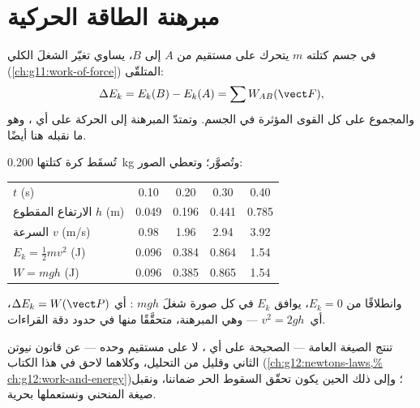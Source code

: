 \section{مبرهنة الطاقة الحركية}

\begin{theorem}\label{thm:g11:mechanical-energy:ketheorem}
في جسم كتلته $m$ يتحرك على مستقيم من $A$ إلى $B$،
يساوي تغيّر  الشغلَ الكلي
(\cref{ch:g11:work-of-force}) المتلقّى:
\[
\Delta E_k = E_k(B) - E_k(A) = \sum W_{AB}(\vect F),
\]
والمجموع على كل القوى المؤثرة في الجسم. وتمتدّ المبرهنة إلى
الحركة على أي ، وهو ما نقبله هنا أيضًا.
\end{theorem}
\admitted

\begin{example}\label{ex:g11:mechanical-energy:freefall}
تُسقَط كرة كتلتها \qty{0.200}{kg} وتُصوَّر؛ وتعطي الصور:
\begin{center}\small
\begin{tabular}{lcccc}
$t$ (\unit{s}) & 0.10 & 0.20 & 0.30 & 0.40\\
الارتفاع المقطوع $h$ (\unit{m}) & 0.049 & 0.196 & 0.441 & 0.785\\
السرعة $v$ (\unit{m/s}) & 0.98 & 1.96 & 2.94 & 3.92\\
$E_k = \tfrac12 mv^2$ (\unit{J}) & 0.096 & 0.384 & 0.864 & 1.54\\
$W = mgh$ (\unit{J}) & 0.096 & 0.385 & 0.865 & 1.54
\end{tabular}
\end{center}
وانطلاقًا من $E_k = 0$، يوافق $E_k$ في كل صورة شغلَ $mgh$
: أي $\Delta E_k = W(\vect P)$، أي\ $v^2 = 2gh$ --- وهي المبرهنة،
متحقَّقًا منها في حدود دقة القراءات.
\end{example}

\begin{remark}\label{rem:g11:mechanical-energy:proof}
تنتج الصيغة العامة --- الصحيحة على أي ، لا على مستقيم
وحده --- عن قانون نيوتن الثاني وقليل من التحليل، وكلاهما
لاحق في هذا الكتاب (\cref{ch:g12:newtons-laws,%
ch:g12:work-and-energy})؛ وإلى ذلك الحين يكون تحقّق السقوط الحر
ضماننا، ونقبل صيغة  المنحني ونستعملها بحرية.
\end{remark}

